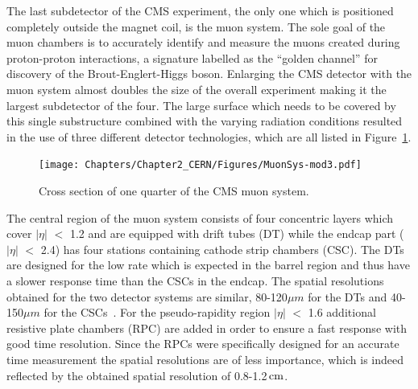 The last subdetector of the CMS experiment, the only one which is positioned completely outside the magnet coil, is the muon system. The sole goal of the muon chambers is to accurately identify and measure the muons created during proton-proton interactions, a signature labelled as the ``golden channel'' for discovery of the Brout-Englert-Higgs boson. %
Enlarging the CMS detector with the muon system almost doubles the size of the overall experiment making it the largest subdetector of the four. 
The large surface which needs to be covered by this single substructure combined with the varying radiation conditions resulted in the use of three different detector technologies, which are all listed in Figure~\ref{fig::MuonAndCMS}.
\begin{figure}[h!t]
 \centering
 \texttt{[image: Chapters/Chapter2\_CERN/Figures/MuonSys-mod3.pdf]}
 \caption{Cross section of one quarter of the CMS muon system.} \label{fig::MuonAndCMS}
\end{figure}

The central region of the muon system consists of four concentric layers which cover $\vert \eta \vert$ $<$ 1.2 and are equipped with drift tubes (DT) while the endcap part ($\vert \eta \vert$ $<$ 2.4) has four stations containing cathode strip chambers (CSC). The DTs are designed for the low rate which is expected in the barrel region and thus have a slower response time than the CSCs in the endcap. 
The spatial resolutions obtained for the two detector systems are similar, 80-120$\unit{\mu m}$ for the DTs and 40-150$\unit{\mu m}$ for the CSCs~\cite{MuonPerformance}.
For the pseudo-rapidity region $\vert \eta \vert$ $<$ 1.6 additional resistive plate chambers (RPC) are added in order to ensure a fast response with good time resolution. Since the RPCs were specifically designed for an accurate time measurement the spatial resolutions are of less importance, which is indeed reflected by the obtained spatial resolution of 0.8-1.2$\, \mathrm{cm}$. %

